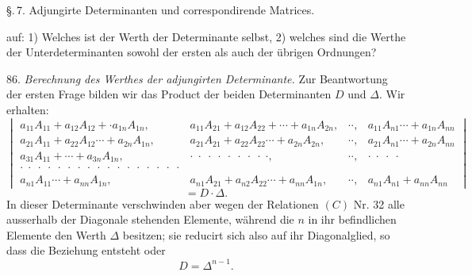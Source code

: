 \S.\,7. Adjungirte Determinanten und correspondirende Matrices.

auf: 1) Welches ist der Werth der Determinante selbst, 2) welches sind die Werthe der Unterdeterminanten sowohl der ersten als auch der übrigen Ordnungen?

86. \textit{Berechnung des Werthes der adjungirten Determinante.} Zur Beantwortung der ersten Frage bilden wir das Product der beiden Determinanten $D$ und $\Delta$. Wir erhalten:
\[
\begin{vmatrix}
a_{11}A_{11}+a_{12}A_{12}+\cdot a_{1n}A_{1n}, & a_{11}A_{21}+a_{12}A_{22}+\cdots+a_{1n}A_{2n}, & \cdot\cdot, & a_{11}A_{n1}\cdots+a_{1n}A_{nn} \\
a_{21}A_{11}+a_{22}A_{12}\cdots+a_{2n}A_{1n}, & a_{21}A_{21}+a_{22}A_{22}\cdots+a_{2n}A_{2n}, & \cdot\cdot, & a_{21}A_{n1}\cdots+a_{2n}A_{nn} \\
a_{31}A_{11}+\cdots+a_{3n}A_{1n}, & \cdot\;\cdot\;\cdot\;\cdot\;\cdot\;\cdot\;\cdot\;\cdot\;\cdot, & \cdot\cdot, & \cdot\;\cdot\;\cdot\;\cdot \\
\cdot\;\cdot\;\cdot\;\cdot\;\cdot\;\cdot\;\cdot\;\cdot\;\cdot\;\cdot\;\cdot\;\cdot\;\cdot\;\cdot\;\cdot\;\cdot\;\cdot & & & \\
a_{n1}A_{11}\cdots+a_{nn}A_{1n}, & a_{n1}A_{21}+a_{n2}A_{22}\cdots+a_{nn}A_{1n}, & \cdot\cdot, & a_{n1}A_{n1}+a_{nn}A_{nn}
\end{vmatrix}
\]
\[
= D\cdot\Delta.
\]
In dieser Determinante verschwinden aber wegen der Relationen $(C)$ Nr. 32 alle ausserhalb der Diagonale stehenden Elemente, während die $n$ in ihr befindlichen Elemente den Werth $\Delta$ besitzen; sie reducirt sich also auf ihr Diagonalglied, so dass die Beziehung entsteht
oder
\[
D=\Delta^{n-1}.
\]

